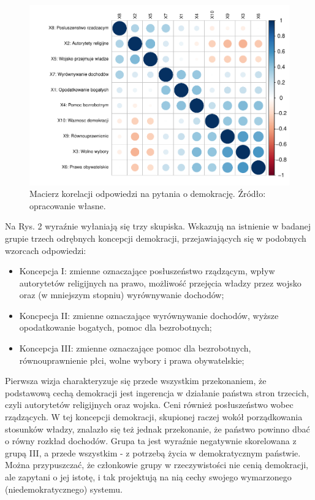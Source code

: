 \documentclass[12pt]{article}
\providecommand{\tightlist}{%
  \setlength{\itemsep}{0pt}\setlength{\parskip}{0pt}}
\begin{document}
\begin{figure}

\includegraphics{text_ASA_files/figure-latex/cor-matrix-1} \hfill{}

\caption{Macierz korelacji odpowiedzi na pytania o demokrację. Źródło: opracowanie własne.}\label{fig:cor-matrix}
\end{figure}

Na Rys. 2 wyraźnie wyłaniają się trzy skupiska. Wskazują na istnienie w badanej grupie trzech odrębnych koncepcji demokracji, przejawiających się w podobnych wzorcach odpowiedzi:

\begin{itemize}
\tightlist
\item
  Koncepcja I: zmienne oznaczające posłuszeństwo rządzącym, wpływ autorytetów religijnych na prawo, możliwość przejęcia władzy przez wojsko oraz (w mniejszym stopniu) wyrównywanie dochodów;
\item
  Koncpecja II: zmienne oznaczające wyrównywanie dochodów, wyższe opodatkowanie bogatych, pomoc dla bezrobotnych;
\item
  Koncepcja III: zmienne oznaczające pomoc dla bezrobotnych, równouprawnienie płci, wolne wybory i prawa obywatelskie;
\end{itemize}

Pierwsza wizja charakteryzuje się przede wszystkim przekonaniem, że podstawową cechą demokracji jest ingerencja w działanie państwa stron trzecich, czyli autorytetów religijnych oraz wojska. Ceni również posłuszeństwo wobec rządzących. W tej koncepcji demokracji, skupionej raczej wokół porządkowania stosunków władzy, znalazło się też jednak przekonanie, że państwo powinno dbać o równy rozkład dochodów. Grupa ta jest wyraźnie negatywnie skorelowana z grupą III, a przede wszystkim - z potrzebą życia w demokratycznym państwie. Można przypuszczać, że członkowie grupy w rzeczywistości nie cenią demokracji, ale zapytani o jej istotę, i tak projektują na nią cechy swojego wymarzonego (niedemokratycznego) systemu.
\end{document}
